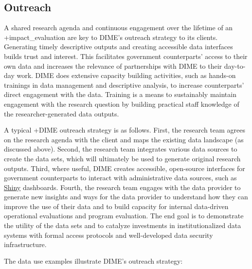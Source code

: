 \documentclass[
]{book}
\begin{document}
\hypertarget{outreach-6}{%
\subsection{Outreach}\label{outreach-6}}

A shared research agenda and continuous engagement over the lifetime of an +impact\_evaluation\textbar{} are key to DIME's outreach strategy to its clients. Generating timely descriptive outputs and creating accessible data interfaces builds trust and interest. This facilitates government counterparts' access to their own data and increases the relevance of partnerships with DIME to their day-to-day work. DIME does extensive capacity building activities, such as hands-on trainings in data management and descriptive analysis, to increase counterparts' direct engagement with the data. Training is a means to sustainably maintain engagement with the research question by building practical staff knowledge of the researcher-generated data outputs.

A typical +DIME\textbar{} outreach strategy is as follows. First, the research team agrees on the research agenda with the client and maps the existing data landscape (as discussed above). Second, the research team integrates various data sources to create the data sets, which will ultimately be used to generate original research outputs. Third, where useful, DIME creates accessible, open-source interfaces for government counterparts to interact with administrative data sources, such as \href{https://shiny.rstudio.com/}{Shiny} dashboards. Fourth, the research team engages with the data provider to generate new insights and ways for the data provider to understand how they can improve the use of their data and to build capacity for internal data-driven operational evaluations and program evaluation. The end goal is to demonstrate the utility of the data sets and to catalyze investments in institutionalized data systems with formal access protocols and well-developed data security infrastructure.

The data use examples illustrate DIME's outreach strategy:
\end{document}
